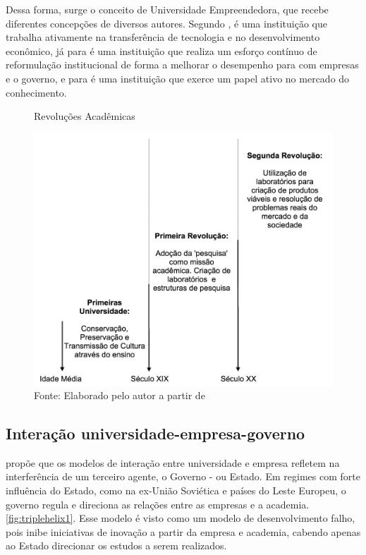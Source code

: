 Dessa forma, surge o conceito de Universidade Empreendedora, que recebe diferentes concepções de diversos autores. Segundo , é uma instituição que trabalha ativamente na transferência de tecnologia e no desenvolvimento econômico, já para  é uma instituição que realiza um esforço contínuo de reformulação institucional de forma a melhorar o desempenho para com empresas e o governo, e para  é uma instituição que exerce um papel ativo no mercado do conhecimento.

\begin{figure}
\caption{Revoluções Acadêmicas}
\centerline{\includegraphics[scale=0.5]{img/academic_revolutions}}
\label{fig:academic_revolutions}
\caption* {Fonte: Elaborado pelo autor a partir de }
\end{figure}

\subsection{Interação universidade-empresa-governo}
\label{cha:univ_empreend}

 propõe que os modelos de interação entre universidade e empresa refletem na interferência de um terceiro agente, o Governo - ou Estado. Em regimes com forte influência do Estado, como na ex-União Soviética e países do Leste Europeu, o governo regula e direciona as relações entre as empresas e a academia. \ref{fig:triplehelix1}. Esse modelo é visto como um modelo de desenvolvimento falho, pois inibe iniciativas de inovação a partir da empresa e academia, cabendo apenas ao Estado direcionar os estudos a serem realizados.

